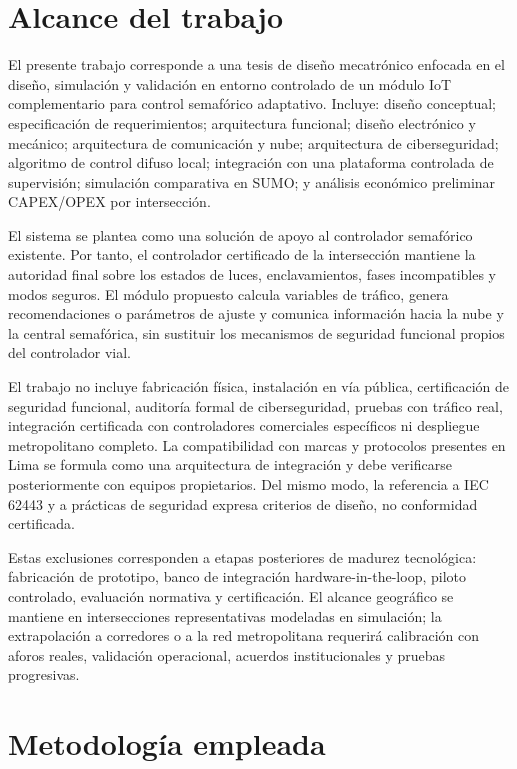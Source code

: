 \documentclass[12pt,a4paper,oneside]{report}
\begin{document}
\section{Alcance del trabajo}\label{alcance-del-trabajo}

El presente trabajo corresponde a una tesis de diseño mecatrónico enfocada en el diseño, simulación y validación en entorno controlado de un módulo IoT complementario para control semafórico adaptativo. Incluye: diseño conceptual; especificación de requerimientos; arquitectura funcional; diseño electrónico y mecánico; arquitectura de comunicación y nube; arquitectura de ciberseguridad; algoritmo de control difuso local; integración con una plataforma controlada de supervisión; simulación comparativa en SUMO; y análisis económico preliminar CAPEX/OPEX por intersección.

El sistema se plantea como una solución de apoyo al controlador semafórico existente. Por tanto, el controlador certificado de la intersección mantiene la autoridad final sobre los estados de luces, enclavamientos, fases incompatibles y modos seguros. El módulo propuesto calcula variables de tráfico, genera recomendaciones o parámetros de ajuste y comunica información hacia la nube y la central semafórica, sin sustituir los mecanismos de seguridad funcional propios del controlador vial.

El trabajo no incluye fabricación física, instalación en vía pública, certificación de seguridad funcional, auditoría formal de ciberseguridad, pruebas con tráfico real, integración certificada con controladores comerciales específicos ni despliegue metropolitano completo. La compatibilidad con marcas y protocolos presentes en Lima se formula como una arquitectura de integración y debe verificarse posteriormente con equipos propietarios. Del mismo modo, la referencia a IEC 62443 y a prácticas de seguridad expresa criterios de diseño, no conformidad certificada.

Estas exclusiones corresponden a etapas posteriores de madurez tecnológica: fabricación de prototipo, banco de integración hardware-in-the-loop, piloto controlado, evaluación normativa y certificación. El alcance geográfico se mantiene en intersecciones representativas modeladas en simulación; la extrapolación a corredores o a la red metropolitana requerirá calibración con aforos reales, validación operacional, acuerdos institucionales y pruebas progresivas.

\section{Metodología empleada}\label{metodologuxeda-empleada}
\end{document}
